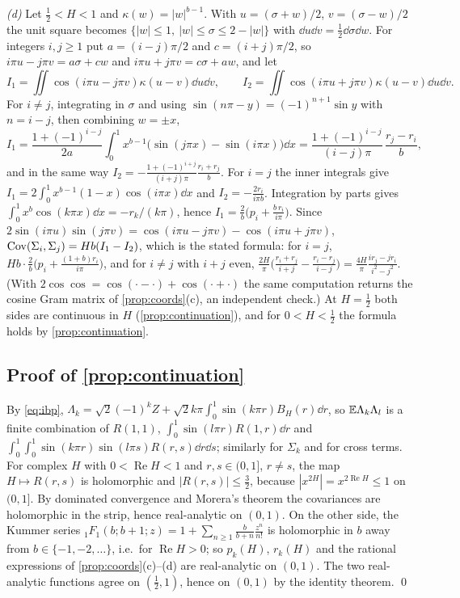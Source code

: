 \emph{(d)} Let $\frac12<H<1$ and $\kappa(w)=|w|^{b-1}$. With $u=(\sigma+w)/2$, $v=(\sigma-w)/2$ the unit square becomes
$\{|w|\le1,\ |w|\le\sigma\le2-|w|\}$ with $\dd u\dd v=\frac12\dd\sigma\dd w$. For integers $i,j\ge1$ put
$a=(i-j)\pi/2$ and $c=(i+j)\pi/2$, so $i\pi u-j\pi v=a\sigma+cw$ and $i\pi u+j\pi v=c\sigma+aw$, and let
\[I_1=\iint\cos(i\pi u-j\pi v)\kappa(u-v)\dd u\dd v,\qquad I_2=\iint\cos(i\pi u+j\pi v)\kappa(u-v)\dd u\dd v.\]
For $i\ne j$, integrating in $\sigma$ and using $\sin(n\pi-y)=(-1)^{n+1}\sin y$ with $n=i-j$, then combining $w=\pm x$,
\[I_1=\frac{1+(-1)^{i-j}}{2a}\int_0^1x^{b-1}\big(\sin(j\pi x)-\sin(i\pi x)\big)\dd x=\frac{1+(-1)^{i-j}}{(i-j)\pi}\,\frac{r_j-r_i}b,\]
and in the same way $I_2=-\frac{1+(-1)^{i+j}}{(i+j)\pi}\frac{r_i+r_j}b$. For $i=j$ the inner integrals give
$I_1=2\int_0^1x^{b-1}(1-x)\cos(i\pi x)\dd x$ and $I_2=-\frac{2r_i}{i\pi b}$. Integration by parts gives
$\int_0^1x^b\cos(k\pi x)\dd x=-r_k/(k\pi)$, hence $I_1=\frac2b\big(p_i+\frac{b\,r_i}{i\pi}\big)$. Since
$2\sin(i\pi u)\sin(j\pi v)=\cos(i\pi u-j\pi v)-\cos(i\pi u+j\pi v)$,
$\operatorname{Cov}(\Sigma_i,\Sigma_j)=Hb(I_1-I_2)$, which is the stated formula: for $i=j$,
$Hb\cdot\frac2b\big(p_i+\frac{(1+b)r_i}{i\pi}\big)$, and for $i\ne j$ with $i+j$ even,
$\frac{2H}\pi\big(\frac{r_i+r_j}{i+j}-\frac{r_i-r_j}{i-j}\big)=\frac{4H}\pi\frac{ir_j-jr_i}{i^2-j^2}$. (With
$2\cos\cos=\cos(\cdot-\cdot)+\cos(\cdot+\cdot)$ the same computation returns the cosine Gram matrix of
\cref{prop:coords}(c), an independent check.) At $H=\frac12$ both sides are continuous in $H$ (\cref{prop:continuation}),
and for $0<H<\frac12$ the formula holds by \cref{prop:continuation}.

\subsection{Proof of \texorpdfstring{\cref{prop:continuation}}{Proposition 2}}
By \eqref{eq:ibp}, $\Lambda_k=\sqrt2(-1)^kZ+\sqrt2k\pi\int_0^1\sin(k\pi r)B_H(r)\dd r$, so $\mathbb E\Lambda_k\Lambda_l$ is a
finite combination of $R(1,1)$, $\int_0^1\sin(l\pi r)R(1,r)\dd r$ and
$\int_0^1\!\int_0^1\sin(k\pi r)\sin(l\pi s)R(r,s)\dd r\dd s$; similarly for $\Sigma_k$ and for cross terms. For complex
$H$ with $0<\operatorname{Re}H<1$ and $r,s\in(0,1]$, $r\ne s$, the map $H\mapsto R(r,s)$ is holomorphic and
$|R(r,s)|\le\frac32$, because $|x^{2H}|=x^{2\operatorname{Re}H}\le1$ on $(0,1]$. By dominated convergence and Morera's
theorem the covariances are holomorphic in the strip, hence real-analytic on $(0,1)$. On the other side, the Kummer
series ${}_1F_1(b;b+1;z)=1+\sum_{n\ge1}\frac{b}{b+n}\frac{z^n}{n!}$ is holomorphic in $b$ away from
$b\in\{-1,-2,\dots\}$, i.e.\ for $\operatorname{Re}H>0$; so $p_k(H)$, $r_k(H)$ and the rational expressions of
\cref{prop:coords}(c)--(d) are real-analytic on $(0,1)$. The two real-analytic functions agree on $(\frac12,1)$, hence
on $(0,1)$ by the identity theorem. \qed


